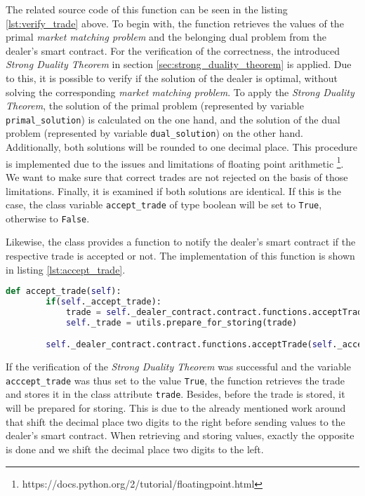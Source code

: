 The related source code of this function can be seen in the listing \ref{lst:verify_trade} above. 
To begin with, the function retrieves the values of the primal \textit{market matching problem} and
the belonging dual problem from the dealer's smart contract. For the verification of the correctness, the introduced \textit{Strong Duality Theorem}
in section \ref{sec:strong_duality_theorem} is applied. 
Due to this, it is possible to verify if the solution of the dealer is optimal, without solving the corresponding
\textit{market matching problem}.
To apply the \textit{Strong Duality Theorem}, the solution of the primal problem (represented by variable \verb|primal_solution|) is calculated
on the one hand, and the solution of the dual problem (represented by variable \verb|dual_solution|) on the other hand.
Additionally, both solutions will be rounded to one decimal place. This procedure is implemented due to the issues and limitations of 
floating point arithmetic \footnote{https://docs.python.org/2/tutorial/floatingpoint.html}. 
We want to make sure that correct trades are not rejected on the basis of those limitations.
Finally, it is examined if both solutions are identical. If this is the case, the class variable \verb|accept_trade| of type boolean will be
set to \verb|True|, otherwise to \verb|False|.

Likewise, the class provides a function to notify the dealer's smart contract if the respective trade is accepted or not.
The implementation of this function is shown in listing \ref{lst:accept_trade}.

\begin{lstlisting}[float=htbp, label=lst:accept_trade, caption=Notification of trade acceptance, language=Python]
    def accept_trade(self):
        if(self._accept_trade):
            trade = self._dealer_contract.contract.functions.acceptTrade(self._accept_trade).call({'from': self._account_address})
            self._trade = utils.prepare_for_storing(trade)

        self._dealer_contract.contract.functions.acceptTrade(self._accept_trade).transact({'from': self._account_address})

\end{lstlisting}

If the verification of the \textit{Strong Duality Theorem} was successful and the variable \verb|acccept_trade| was thus set to the value \verb|True|,
the function retrieves the trade and stores it in the class attribute \verb|trade|. Besides, before the trade is stored, it will be 
prepared for storing. This is due to the already mentioned work around that shift the decimal place two digits to the right before 
sending values to the dealer's smart contract. When retrieving and storing values, exactly the opposite is done and we shift the decimal place 
two digits to the left. 

